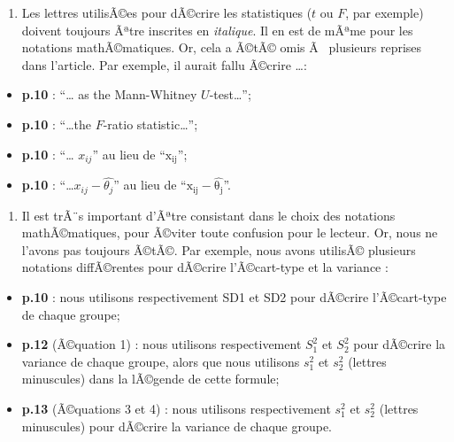 \begin{appendix}
\begin{enumerate}
\def\labelenumi{\arabic{enumi})}
\tightlist
\item
  Les lettres utilisÃ©es pour dÃ©crire les statistiques (\(t\) ou \(F\),
  par exemple) doivent toujours Ãªtre inscrites en \emph{italique}. Il
  en est de mÃªme pour les notations mathÃ©matiques. Or, cela a Ã©tÃ©
  omis Ã~ plusieurs reprises dans l'article. Par exemple, il aurait
  fallu Ã©crire \ldots:
\end{enumerate}

\begin{itemize}
\tightlist
\item
  \textbf{p.10} : ``\ldots{} as the Mann-Whitney
  \color{blue}\(U\)\color{black}-test\ldots{}'';\\
\item
  \textbf{p.10} : ``\ldots the \color{blue}\(F\)\color{black}-ratio
  statistic\ldots{}'';\\
\item
  \textbf{p.10} : ``\ldots{} \(x_{ij}\)'' au lieu de
  ``\(\mathrm{x_{ij}}\)'';\\
\item
  \textbf{p.10} :
  ``\ldots\textbar{}\(x_{ij}-\hat{\theta_j}\)\textbar{}'' au lieu de
  ``\textbar{}\(\mathrm{x_{ij}-\hat{\theta_j}}\)\textbar{}''.
\end{itemize}

\begin{enumerate}
\def\labelenumi{\arabic{enumi})}
\setcounter{enumi}{1}
\tightlist
\item
  Il est trÃ¨s important d'Ãªtre consistant dans le choix des notations
  mathÃ©matiques, pour Ã©viter toute confusion pour le lecteur. Or, nous
  ne l'avons pas toujours Ã©tÃ©. Par exemple, nous avons utilisÃ©
  plusieurs notations diffÃ©rentes pour dÃ©crire l'Ã©cart-type et la
  variance :
\end{enumerate}

\begin{itemize}
\tightlist
\item
  \textbf{p.10} : nous utilisons respectivement SD1 et SD2 pour dÃ©crire
  l'Ã©cart-type de chaque groupe;\\
\item
  \textbf{p.12 }(Ã©quation 1) : nous utilisons respectivement \(S^2_1\)
  et \(S^2_2\) pour dÃ©crire la variance de chaque groupe, alors que
  nous utilisons \(s^2_1\) et \(s^2_2\) (lettres minuscules) dans la
  lÃ©gende de cette formule;\\
\item
  \textbf{p.13} (Ã©quations 3 et 4) : nous utilisons respectivement
  \(s^2_1\) et \(s^2_2\) (lettres minuscules) pour dÃ©crire la variance
  de chaque groupe.
\end{itemize}


\end{appendix}
